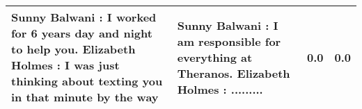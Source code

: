 \begin{table*}[t]
{\begin{tabular}{p{5.5cm}p{5.5cm}cc}
    Sunny Balwani : I worked for 6 years day and night to help you. Elizabeth Holmes : I was just thinking about texting you in that minute by the way  
    & Sunny Balwani : I am responsible for everything at Theranos. Elizabeth Holmes : .........  
    & \cellcolor{red!20} \textbf{0.0} 
    & \cellcolor{red!20} \textbf{0.0} \\ 
    \bottomrule
  \end{tabular}
  }
\end{table*}



    
    
    
  
